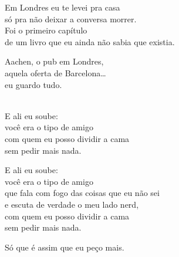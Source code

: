 \begin{lyrics}
Em Londres eu te levei pra casa\\
só pra não deixar a conversa morrer.\\
Foi o primeiro capítulo\\
de um livro que eu ainda não sabia que existia.

Aachen, o pub em Londres,\\
aquela oferta de Barcelona…\\
eu guardo tudo.

\\
E ali eu soube:\\
você era o tipo de amigo\\
com quem eu posso dividir a cama\\
sem pedir mais nada.

E ali eu soube:\\
você era o tipo de amigo\\
que fala com fogo das coisas que eu não sei\\
e escuta de verdade o meu lado nerd,\\
com quem eu posso dividir a cama\\
sem pedir mais nada.

Só que é assim que eu peço mais.
\end{lyrics}

